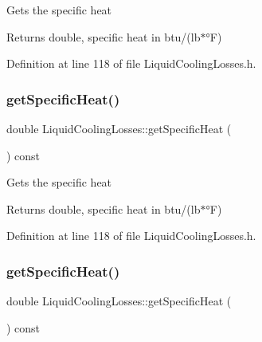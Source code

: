 Gets the specific heat \begin{DoxyReturn}{Returns}
double, specific heat in btu/(lb$\ast$°F) 
\end{DoxyReturn}


Definition at line 118 of file Liquid\+Cooling\+Losses.\+h.

\mbox{\label{class_liquid_cooling_losses_aa60623b6f1fab605d25c9c24e8dd00ec}} 
\subsubsection{\texorpdfstring{get\+Specific\+Heat()}{getSpecificHeat()}\hspace{0.1cm}{\footnotesize\ttfamily [2/3]}}
{\footnotesize\ttfamily double Liquid\+Cooling\+Losses\+::get\+Specific\+Heat (\begin{DoxyParamCaption}{ }\end{DoxyParamCaption}) const\hspace{0.3cm}{\ttfamily [inline]}}

Gets the specific heat \begin{DoxyReturn}{Returns}
double, specific heat in btu/(lb$\ast$°F) 
\end{DoxyReturn}


Definition at line 118 of file Liquid\+Cooling\+Losses.\+h.

\mbox{\label{class_liquid_cooling_losses_aa60623b6f1fab605d25c9c24e8dd00ec}} 
\subsubsection{\texorpdfstring{get\+Specific\+Heat()}{getSpecificHeat()}\hspace{0.1cm}{\footnotesize\ttfamily [3/3]}}
{\footnotesize\ttfamily double Liquid\+Cooling\+Losses\+::get\+Specific\+Heat (\begin{DoxyParamCaption}{ }\end{DoxyParamCaption}) const\hspace{0.3cm}{\ttfamily [inline]}}

